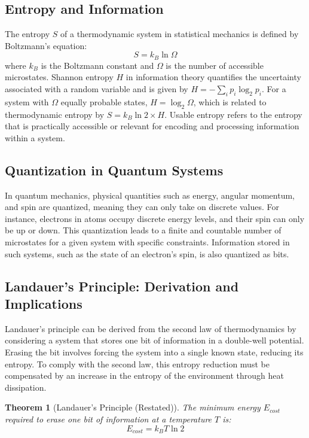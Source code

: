 \documentclass{article}
\newtheorem{theorem}{Theorem}
\begin{document}
	\subsection{Entropy and Information}
	The entropy $S$ of a thermodynamic system in statistical mechanics is defined by Boltzmann's equation:
	\begin{equation}
		S = k_B \ln \Omega
	\end{equation}
	where $k_B$ is the Boltzmann constant and $\Omega$ is the number of accessible microstates. Shannon entropy $H$ in information theory quantifies the uncertainty associated with a random variable and is given by $H = - \sum_i p_i \log_2 p_i$. For a system with $\Omega$ equally probable states, $H = \log_2 \Omega$, which is related to thermodynamic entropy by $S = k_B \ln 2 \times H$. Usable entropy refers to the entropy that is practically accessible or relevant for encoding and processing information within a system.
	
	\subsection{Quantization in Quantum Systems}
	In quantum mechanics, physical quantities such as energy, angular momentum, and spin are quantized, meaning they can only take on discrete values. For instance, electrons in atoms occupy discrete energy levels, and their spin can only be up or down. This quantization leads to a finite and countable number of microstates for a given system with specific constraints. Information stored in such systems, such as the state of an electron's spin, is also quantized as bits.
	
	\subsection{Landauer's Principle: Derivation and Implications}
	Landauer's principle can be derived from the second law of thermodynamics by considering a system that stores one bit of information in a double-well potential. Erasing the bit involves forcing the system into a single known state, reducing its entropy. To comply with the second law, this entropy reduction must be compensated by an increase in the entropy of the environment through heat dissipation.
	
	\begin{theorem}[Landauer's Principle (Restated)]
		The minimum energy $E_{cost}$ required to erase one bit of information at a temperature $T$ is:
		\begin{equation}
			E_{cost} = k_B T \ln 2
		\end{equation}
	\end{theorem}
	
\end{document}
